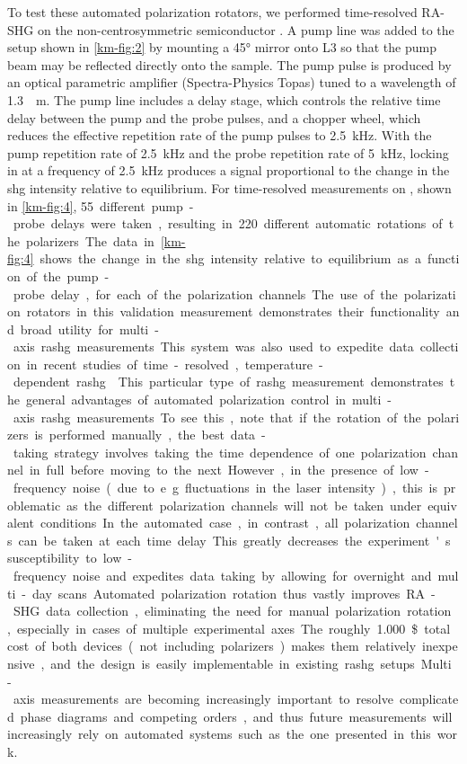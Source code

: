 To test these automated polarization rotators, we performed time-resolved RA-SHG on the non-centrosymmetric semiconductor  \citep{ducuing_observation_1963, torchinsky_low_2014}. 
A pump line was added to the setup shown in \cref{km-fig:2} by mounting a \ang{45} mirror onto L3 so that the pump beam may be reflected directly onto the sample. 
The pump pulse is produced by an optical parametric amplifier (Spectra-Physics Topas) tuned to a wavelength of \qty{1.3}{\mu m}.
The pump line includes a delay stage, which controls the relative time delay between the pump and the probe pulses, and a chopper wheel, which reduces the effective repetition rate of the pump pulses to \qty{2.5}{kHz}. 
With the pump repetition rate of \qty{2.5}{kHz} and the probe repetition rate of \qty{5}{kHz}, locking in at a frequency of \qty{2.5}{kHz} produces a signal proportional to the change in the \gls{shg} intensity relative to equilibrium.
For time-resolved measurements on , shown in \cref{km-fig:4}, \qty{55} different pump-probe delays were taken, resulting in \qty{220} different automatic rotations of the polarizers.
The data in \cref{km-fig:4} shows the change in the \gls{shg} intensity relative to equilibrium as a function of the pump-probe delay, for each of the polarization channels. 
The use of the polarization rotators in this validation measurement demonstrates their functionality and broad utility for multi-axis \gls{rashg} measurements.

This system was also used to expedite data collection in recent studies of time-resolved, temperature-dependent \gls{rashg} \citep{camn2bi2}.
This particular type of \gls{rashg} measurement demonstrates the general advantages of automated polarization control in multi-axis \gls{rashg} measurements.
To see this, note that if the rotation of the polarizers is performed manually, the best data-taking strategy involves taking the time dependence of one polarization channel in full before moving to the next. 
However, in the presence of low-frequency noise (due to e.g. fluctuations in the laser intensity), this is problematic as the different polarization channels will not be taken under equivalent conditions. 
In the automated case, in contrast, all polarization channels can be taken at each time delay. 
This greatly decreases the experiment's susceptibility to low-frequency noise and expedites data taking by allowing for overnight and multi-day scans.

Automated polarization rotation thus vastly improves RA-SHG data collection, eliminating the need for manual polarization rotation, especially in cases of multiple experimental axes. 
The roughly \qty{1,000}{\$} total cost of both devices (not including polarizers) makes them relatively inexpensive, and the design is easily implementable in existing \gls{rashg} setups.
Multi-axis measurements are becoming increasingly important to resolve complicated phase diagrams and competing orders, and thus future measurements will increasingly rely on automated systems such as the one presented in this work.
